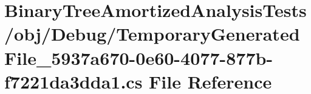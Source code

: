 \hypertarget{_binary_tree_amortized_analysis_tests_2obj_2_debug_2_temporary_generated_file__5937a670-0e60-4077-877b-f7221da3dda1_8cs}{}\section{Binary\+Tree\+Amortized\+Analysis\+Tests/obj/\+Debug/\+Temporary\+Generated\+File\+\_\+5937a670-\/0e60-\/4077-\/877b-\/f7221da3dda1.cs File Reference}
\label{_binary_tree_amortized_analysis_tests_2obj_2_debug_2_temporary_generated_file__5937a670-0e60-4077-877b-f7221da3dda1_8cs}
